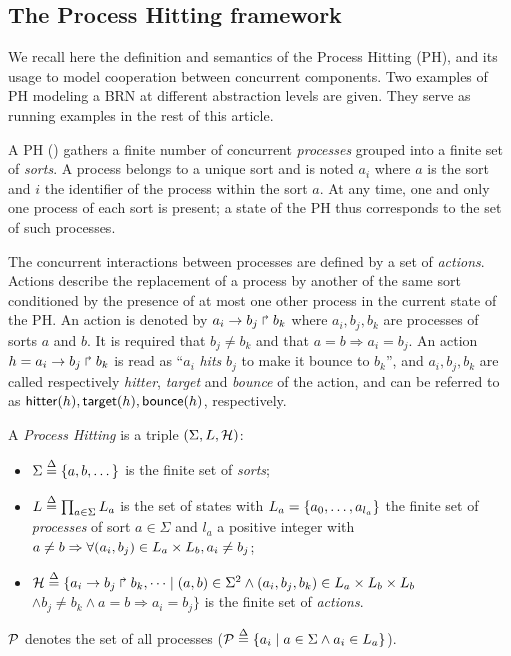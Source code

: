 \subsection{The Process Hitting framework}
\label{ssec:PH}

We recall here the definition and semantics of the Process Hitting (PH), and its usage to model
cooperation between concurrent components.
Two examples of PH modeling a BRN at different abstraction levels are given.
They serve as running examples in the rest of this article.

\medskip

A PH () gathers a finite number of concurrent \emph{processes}
grouped into a finite set of \emph{sorts}.
A process belongs to a unique sort and is noted $a_i$ where $a$ is the
sort and $i$ the identifier of the process within the sort $a$.
At any time, one and only one process of each sort is present; a state of the PH thus corresponds to the set of such processes.
 
The concurrent interactions between processes are defined by a set of
\emph{actions}.
Actions describe the replacement of a process by another of the same sort
conditioned by the presence of at most one other process in the current
state of the PH.
An action is denoted by $a_i\rightarrow b_j\Rsh b_k$ where $a_i,b_j,b_k$ are processes
of sorts $a$ and $b$.
It is required that $b_j\neq b_k$ and that $a=b\Rightarrow a_i=b_j$.
An action $h=a_i\rightarrow b_j\Rsh b_k$ is read as ``$a_i$ \emph{hits} $b_j$ to
make it bounce to $b_k$'', and
$a_i,b_j,b_k$ are called respectively \emph{hitter}, \emph{target} and
\emph{bounce} of the action, and can be referred to as
$\mathsf{hitter}(h), \mathsf{target}(h), \mathsf{bounce}(h)$, respectively.

\begin{definition}\label{def:PH}
A \emph{Process Hitting} is a triple $(\Sigma,L,\mathcal{H})$:
\begin{itemize}
\item $\Sigma \stackrel{\Delta}= \{a,b,\dots\}$ is the finite set of \emph{sorts};
\item $L \stackrel{\Delta}= \prod_{a\in\Sigma} L_a$ is the set of states with $L_a = \{a_0,\dots,a_{l_a}\}$
the finite set of \emph{processes} of sort $a\in\Sigma$ and $l_a$ a positive integer with
	$a\neq b\Rightarrow \forall(a_i,b_j)\in L_a\times L_b,a_i\neq b_j$;
\item $\mathcal{H} \stackrel{\Delta}= \{ a_i\rightarrow b_j\Rsh b_k, \dots \mid
					(a,b)\in\Sigma^2 \wedge (a_i,b_j,b_k)\in L_a\times L_b\times L_b$ \\
	\hspace*{2cm} $\wedge b_j\neq b_k \wedge a=b\Rightarrow a_i=b_j\}$
			is the finite set of \emph{actions}.
\end{itemize}
$\mathcal{P}$ denotes the set of all processes ($\mathcal{P} \stackrel{\Delta}= \{ a_i\mid a\in\Sigma \wedge a_i\in L_a\}$).
\end{definition}

